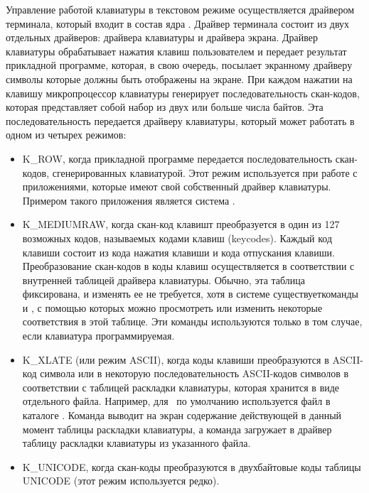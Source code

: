 Управление работой клавиатуры в текстовом режиме осуществляется драйвером терминала, который входит в состав ядра \linux.
Драйвер терминала состоит из двух отдельных драйверов: драйвера клавиатуры и драйвера экрана. Драйвер
клавиатуры обрабатывает нажатия клавиш пользователем и передает результат прикладной программе, которая, в
свою очередь, посылает экранному драйверу символы которые должны быть отображены на экране.
При каждом нажатии на клавишу микропроцессор клавиатуры генерирует последовательность скан-кодов, которая представляет
собой набор из двух или больше числа байтов.
Эта последовательность передается драйверу клавиатуры, который может работать в одном из четырех режимов:

\begin{itemize}
	\item K\_ROW, когда прикладной программе передается последовательность скан-кодов, сгенерированных клавиатурой.
		Этот режим используется при работе с приложениями, которые имеют свой собственный драйвер клавиатуры. Примером
		такого приложения является система .
	\item K\_MEDIUMRAW, когда скан-код клавишт преобразуется в один из 127 возможных кодов, называемых кодами клавиш (keycodes).
		Каждый код клавиши состоит из кода нажатия клавиши и кода отпускания клавиши. Преобразование скан-кодов
		в коды клавиш осуществляется в соответствии с внутренней таблицей драйвера клавиатуры. Обычно, 
		эта таблица фиксирована, и изменять ее не требуется, хотя в системе существуеткоманды  и 
		, с помощью которых можно просмотреть или изменить некоторые соответствия в этой
		таблице. Эти команды используются только в том случае, если клавиатура программируемая.
	\item K\_XLATE (или режим ASCII), когда коды клавиши преобразуются в ASCII-код символа или в некоторую последовательность
		ASCII-кодов символов в соответствии с таблицей раскладки клавиатуры, которая хранится в виде отдельного файла.
		Например, для \fulllinux\ по умолчанию используется файл  в 
		каталоге . Команда  выводит на экран
		содержание действующей в данный момент таблицы раскладки клавиатуры, а команда  загружает
		в драйвер таблицу раскладки клавиатуры из указанного файла.
	\item K\_UNICODE, когда скан-коды преобразуются в двухбайтовые коды таблицы UNICODE (этот режим используется редко).
\end{itemize}

